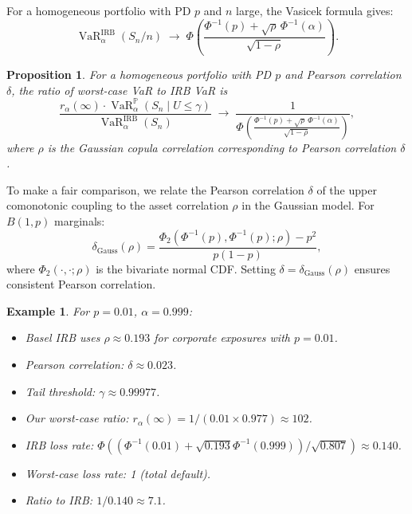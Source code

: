 \documentclass[11pt]{article}
\newtheorem{proposition}[theorem]{Proposition}
\newtheorem{example}[theorem]{Example}
\theoremstyle{definition}
\newcommand{\VaR}{\operatorname{VaR}}
\newcommand{\PP}{\mathbb{P}}
\newcommand{\1}{\mathbf{1}}
\begin{document}
For a homogeneous portfolio with PD $p$ and $n$ large, the Vasicek formula gives:
\begin{equation}\label{eq:vasicek}
  \VaR_\alpha^{\mathrm{IRB}}(S_n/n) \;\to\;
  \Phi\!\left(\frac{\Phi^{-1}(p) + \sqrt{\rho}\,\Phi^{-1}(\alpha)}{\sqrt{1-\rho}}\right).
\end{equation}

\begin{proposition}\label{prop:irb_comparison}
For a homogeneous portfolio with PD $p$ and Pearson correlation $\delta$, the ratio of worst-case VaR to IRB VaR is
\begin{equation}\label{eq:irb_ratio}
  \frac{r_\alpha(\infty) \cdot \VaR_\alpha^\PP(S_n \mid U \leq \gamma)}{\VaR_\alpha^{\mathrm{IRB}}(S_n)}
  \;\to\; \frac{1}{\Phi\!\left(\frac{\Phi^{-1}(p) + \sqrt{\rho}\,\Phi^{-1}(\alpha)}{\sqrt{1-\rho}}\right)},
\end{equation}
where $\rho$ is the Gaussian copula correlation corresponding to Pearson correlation $\delta$.
\end{proposition}

To make a fair comparison, we relate the Pearson correlation $\delta$ of the upper comonotonic coupling to the asset correlation $\rho$ in the Gaussian model. For $B(1,p)$ marginals:
\begin{equation}\label{eq:gauss_cor}
  \delta_{\mathrm{Gauss}}(\rho) = \frac{\Phi_2(\Phi^{-1}(p), \Phi^{-1}(p); \rho) - p^2}{p(1-p)},
\end{equation}
where $\Phi_2(\cdot, \cdot; \rho)$ is the bivariate normal CDF. Setting $\delta = \delta_{\mathrm{Gauss}}(\rho)$ ensures consistent Pearson correlation.

\begin{example}\label{ex:irb_comparison}
For $p = 0.01$, $\alpha = 0.999$:
\begin{itemize}
  \item Basel IRB uses $\rho \approx 0.193$ for corporate exposures with $p = 0.01$.
  \item Pearson correlation: $\delta \approx 0.023$.
  \item Tail threshold: $\gamma \approx 0.99977$.
  \item Our worst-case ratio: $r_\alpha(\infty) = 1/(0.01 \times 0.977) \approx 102$.
  \item IRB loss rate: $\Phi((\Phi^{-1}(0.01) + \sqrt{0.193}\Phi^{-1}(0.999))/\sqrt{0.807}) \approx 0.140$.
  \item Worst-case loss rate: 1 (total default).
  \item Ratio to IRB: $1/0.140 \approx 7.1$.
\end{itemize}
\end{example}
\end{document}
